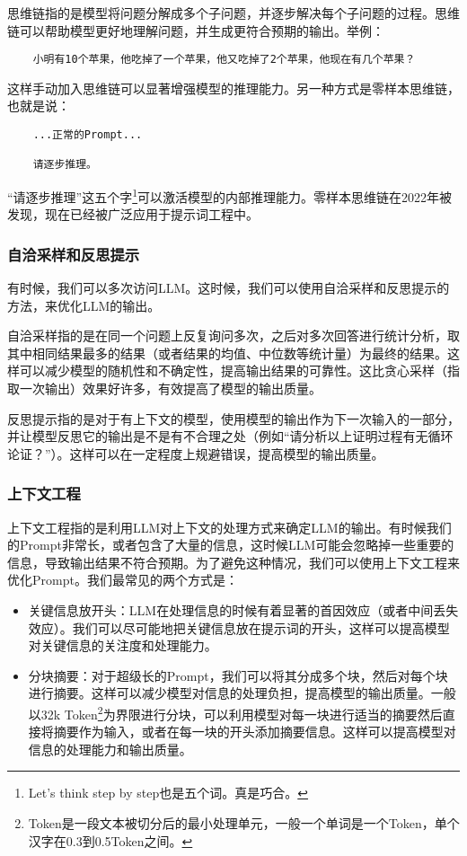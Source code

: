 \documentclass[../main.tex]{subfiles}
\begin{document}
思维链指的是模型将问题分解成多个子问题，并逐步解决每个子问题的过程。思维链可以帮助模型更好地理解问题，并生成更符合预期的输出。举例：

\begin{lstlisting}
    小明有10个苹果，他吃掉了一个苹果，他又吃掉了2个苹果，他现在有几个苹果？
\end{lstlisting}

这样手动加入思维链可以显著增强模型的推理能力。另一种方式是零样本思维链，也就是说：
\begin{lstlisting}
    ...正常的Prompt...

    请逐步推理。
\end{lstlisting}
“请逐步推理”这五个字\footnote{Let's think step by step也是五个词。真是巧合。}可以激活模型的内部推理能力。零样本思维链在2022年被发现，现在已经被广泛应用于提示词工程中。

\subsubsection{自洽采样和反思提示}

有时候，我们可以多次访问LLM。这时候，我们可以使用自洽采样和反思提示的方法，来优化LLM的输出。

自洽采样指的是在同一个问题上反复询问多次，之后对多次回答进行统计分析，取其中相同结果最多的结果（或者结果的均值、中位数等统计量）为最终的结果。这样可以减少模型的随机性和不确定性，提高输出结果的可靠性。这比贪心采样（指取一次输出）效果好许多，有效提高了模型的输出质量。

反思提示指的是对于有上下文的模型，使用模型的输出作为下一次输入的一部分，并让模型反思它的输出是不是有不合理之处（例如“请分析以上证明过程有无循环论证？”）。这样可以在一定程度上规避错误，提高模型的输出质量。

\subsubsection{上下文工程}

上下文工程指的是利用LLM对上下文的处理方式来确定LLM的输出。有时候我们的Prompt非常长，或者包含了大量的信息，这时候LLM可能会忽略掉一些重要的信息，导致输出结果不符合预期。为了避免这种情况，我们可以使用上下文工程来优化Prompt。我们最常见的两个方式是：
\begin{itemize}
  \item 关键信息放开头：LLM在处理信息的时候有着显著的首因效应（或者中间丢失效应）。我们可以尽可能地把关键信息放在提示词的开头，这样可以提高模型对关键信息的关注度和处理能力。
  \item 分块摘要：对于超级长的Prompt，我们可以将其分成多个块，然后对每个块进行摘要。这样可以减少模型对信息的处理负担，提高模型的输出质量。一般以32k Token\footnote{Token是一段文本被切分后的最小处理单元，一般一个单词是一个Token，单个汉字在0.3到0.5Token之间。}为界限进行分块，可以利用模型对每一块进行适当的摘要然后直接将摘要作为输入，或者在每一块的开头添加摘要信息。这样可以提高模型对信息的处理能力和输出质量。
\end{itemize}
\end{document}

